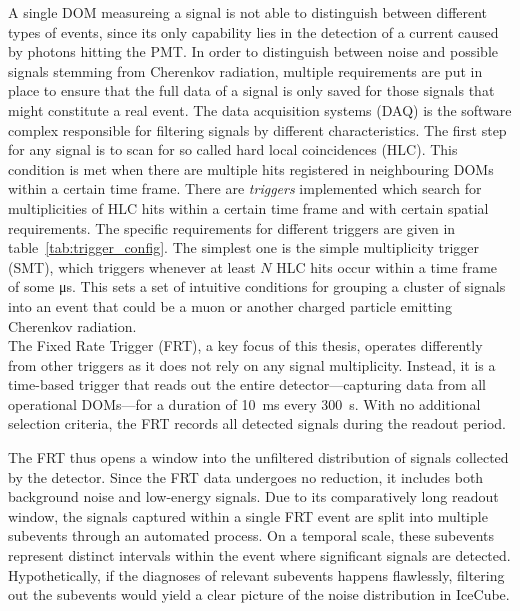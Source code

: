 A single DOM measureing a signal is not able to distinguish between different types of events, since its only capability lies in the detection of a current
caused by photons hitting the PMT\@. In order to distinguish between noise and possible signals stemming from Cherenkov radiation, multiple requirements are
put in place to ensure that the full data of a signal is only saved for those signals that might constitute a real event. The data acquisition systems (DAQ)
is the software complex responsible for filtering signals by different characteristics. The first step for any signal is to scan for so called hard local 
coincidences (HLC). This condition is met when there are multiple hits registered in neighbouring DOMs within a certain time frame.
There are \textit{triggers} implemented which search for multiplicities of HLC hits within a certain time frame and with certain spatial requirements.
The specific requirements for different triggers are given in table~\ref{tab:trigger_config}.
The simplest one is the simple multiplicity trigger (SMT), which triggers whenever at least $N$ HLC hits occur within a time frame of some 
\si{\micro\second}. This sets a set of intuitive conditions for grouping a cluster of signals into an event that could be a muon or another 
charged particle emitting Cherenkov radiation. \\
The Fixed Rate Trigger (FRT), a key focus of this thesis, operates differently from other triggers as it does not rely on any signal multiplicity. Instead, it is
a time-based trigger that reads out the entire detector—capturing data from all operational DOMs—for a duration of \SI{10}{ms} every \SI{300}{s}. With no additional
selection criteria, the FRT records all detected signals during the readout period.

The FRT thus opens a window into the unfiltered distribution of signals collected by the detector. Since the FRT data undergoes no reduction, 
it includes both background noise and low-energy signals. Due to its comparatively long readout window, the signals captured within a single 
FRT event are split into multiple subevents through an automated process. On a temporal scale, these subevents represent distinct intervals within the event 
where significant signals are detected. 
Hypothetically, if the diagnoses of relevant subevents happens flawlessly, filtering out 
the subevents would yield a clear picture of the noise distribution in IceCube. 



